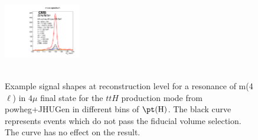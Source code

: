 \begin{figure}[htb]
\begin{center}
{      \includegraphics[width=0.3\textwidth,angle=0]{Figures/Appendix//ttH_powheg_JHUgen_125_4mu_pT4l_genbin4_recobin4_effs_genWeight*pileupWeight*dataMCWeight.pdf}
      \label{fig:sigfits-pT4l-ttH-powheg15-JHUgen-125-maintext:e}
    }
     \\
    \\
    \caption{ Example signal shapes at reconstruction level for a resonance of m(4$\ell$) in $4\mu$ final state for the $ttH$ production mode from {\sc powheg+JHUGen} in different bins of $\pt(\mathrm{H})$. The black curve represents events which do not pass the fiducial volume selection. The curve has no effect on the result.
    }
  \label{fig:sigfits-pT4l-ttH-powheg15-JHUgen-125-maintext}
 \end{center}
\end{figure} \clearpage



